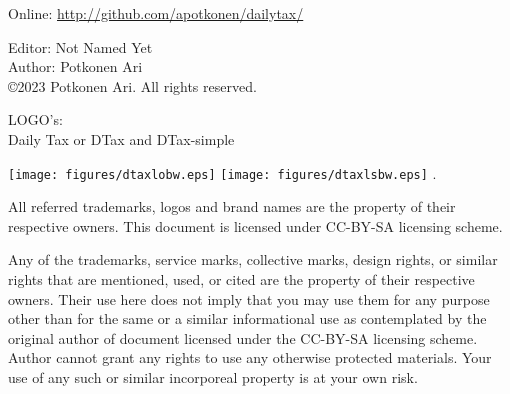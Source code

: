 %
%
\label{rights}
\vspace*{\fill}
Online: \url{http://github.com/apotkonen/dailytax/}
\vspace*{\fill}

Editor: Not Named Yet\\
Author: Potkonen Ari\\
\copyright 2023 Potkonen Ari. All rights reserved.
\vspace{\baselineskip}
\vspace*{\fill}

LOGO's:\\
Daily Tax\textsuperscript{\texttrademark}
or DTax\textsuperscript{\texttrademark} and
DTax\textsuperscript{\texttrademark}-simple

\texttt{[image: figures/dtaxlobw.eps]}
\texttt{[image: figures/dtaxlsbw.eps]}
.
\vspace*{\fill}

All referred trademarks,
logos and brand names are the property of their respective owners.
This document is licensed under CC-BY-SA licensing scheme\cite{CC-BY-SA-40}.
\vspace{\baselineskip}

Any of the trademarks, service marks, collective marks,
design rights, or similar rights that are mentioned, used,
or cited are the property of their respective owners.
Their use here does not imply that you may use them for any purpose other
than for the same or a similar informational use as contemplated by the
original author of document licensed under the CC-BY-SA licensing scheme.
Author cannot grant any rights to use any otherwise protected materials.
Your use of any such or similar incorporeal property is at your own risk. 
